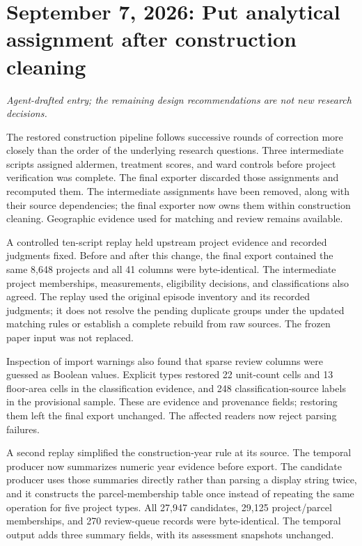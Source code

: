 \section*{September 7, 2026: Put analytical assignment after construction cleaning}
\textit{Agent-drafted entry; the remaining design recommendations are not new research decisions.}

The restored construction pipeline follows successive rounds of correction more
closely than the order of the underlying research questions. Three intermediate
scripts assigned aldermen, treatment scores, and ward controls before project
verification was complete. The final exporter discarded those assignments and
recomputed them. The intermediate assignments have been removed, along with
their source dependencies; the final exporter now owns them within construction
cleaning. Geographic evidence used for matching and review remains available.

A controlled ten-script replay held upstream project evidence and recorded
judgments fixed. Before and after this change, the final export contained the
same 8,648 projects and all 41 columns were byte-identical. The intermediate
project memberships, measurements, eligibility decisions, and classifications
also agreed. The replay used the original episode inventory and its recorded
judgments; it does not resolve the pending duplicate groups under the updated
matching rules or establish a complete rebuild from raw sources. The frozen
paper input was not replaced.

Inspection of import warnings also found that sparse review columns were guessed
as Boolean values. Explicit types restored 22 unit-count cells and 13 floor-area
cells in the classification evidence, and 248 classification-source labels in
the provisional sample. These are evidence and provenance fields; restoring them
left the final export unchanged. The affected readers now reject parsing failures.

A second replay simplified the construction-year rule at its source. The temporal
producer now summarizes numeric year evidence before export. The candidate producer
uses those summaries directly rather than parsing a display string twice, and it
constructs the parcel-membership table once instead of repeating the same operation
for five project types. All 27,947 candidates, 29,125 project/parcel memberships,
and 270 review-queue records were byte-identical. The temporal output adds three
summary fields, with its assessment snapshots unchanged.

